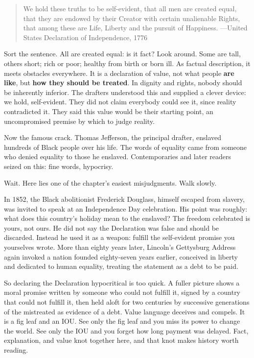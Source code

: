 \begin{quote}
We hold these truths to be self-evident, that all men are created equal, that they are endowed by their Creator with certain unalienable Rights, that among these are Life, Liberty and the pursuit of Happiness. ---United States Declaration of Independence, 1776
\end{quote}
Sort the sentence. All are created equal: is it fact? Look around. Some are tall, others short; rich or poor; healthy from birth or born ill. As factual description, it meets obstacles everywhere. It is a declaration of value, not what people \textbf{are like}, but \textbf{how they should be treated}. In dignity and rights, nobody should be inherently inferior. The drafters understood this and supplied a clever device: we hold, self-evident. They did not claim everybody could see it, since reality contradicted it. They said this value would be their starting point, an uncompromised premise by which to judge reality.

Now the famous crack. Thomas Jefferson, the principal drafter, enslaved hundreds of Black people over his life. The words of equality came from someone who denied equality to those he enslaved. Contemporaries and later readers seized on this: fine words, hypocrisy.

Wait. Here lies one of the chapter's easiest misjudgments. Walk slowly.

In 1852, the Black abolitionist Frederick Douglass, himself escaped from slavery, was invited to speak at an Independence Day celebration. His point was roughly: what does this country's holiday mean to the enslaved? The freedom celebrated is yours, not ours. He did not say the Declaration was false and should be discarded. Instead he used it as a weapon: fulfill the self-evident promise you yourselves wrote. More than eighty years later, Lincoln's Gettysburg Address again invoked a nation founded eighty-seven years earlier, conceived in liberty and dedicated to human equality, treating the statement as a debt to be paid.

So declaring the Declaration hypocritical is too quick. A fuller picture shows a moral promise written by someone who could not fulfill it, signed by a country that could not fulfill it, then held aloft for two centuries by successive generations of the mistreated as evidence of a debt. Value language deceives and compels. It is a fig leaf and an IOU. See only the fig leaf and you miss its power to change the world. See only the IOU and you forget how long payment was delayed. Fact, explanation, and value knot together here, and that knot makes history worth reading.

